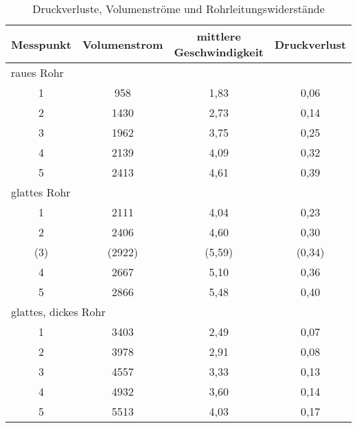 \vspace*{-10.5mm}
\renewcommand{\arraystretch}{1.2}
\begin{table}[h!]
	\centering
	\caption{Druckverluste, Volumenströme und Rohrleitungswiderstände}
	\label{tab:berechnung1}
		\begin{tabular}{c|c|c|c}
			\textbf{Messpunkt}	& \textbf{Volumenstrom} & \textbf{mittlere Geschwindigkeit}	& \textbf{Druckverlust}\\
			\hline
			\multicolumn{4}{l}{raues Rohr} \\
			\hline
			1&958&1,83&0,06\\
			2&1430&2,73&0,14\\
			3&1962&3,75&0,25\\
			4&2139&4,09&0,32\\
			5&2413&4,61&0,39\\
			\hline
			\multicolumn{4}{l}{glattes Rohr} \\
			\hline
			1&2111&4,04&0,23\\
			2&2406&4,60&0,30\\
			(3)&(2922)&(5,59)&(0,34)\\
			4&2667&5,10&0,36\\
			5&2866&5,48&0,40\\
			\hline
			\multicolumn{4}{l}{glattes, dickes Rohr} \\
			\hline
			1&3403&2,49&0,07\\
			2&3978&2,91&0,08\\
			3&4557&3,33&0,13\\
			4&4932&3,60&0,14\\
			5&5513&4,03&0,17\\
		\end{tabular}
\end{table}
\FloatBarrier
\vspace*{-2.5mm}

